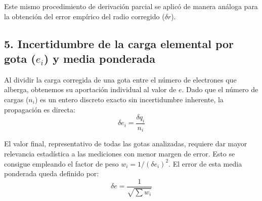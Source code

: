 \documentclass[9pt,a4paper,twocolumn,twoside]{rho-class/rho}
\begin{document}
Este mismo procedimiento de derivación parcial se aplicó de manera análoga para la obtención del error empírico del radio corregido ($\delta r$).

\subsection*{5. Incertidumbre de la carga elemental por gota ($e_i$) y media ponderada}

Al dividir la carga corregida de una gota entre el número de electrones que alberga, obtenemos su aportación individual al valor de $e$. Dado que el número de cargas ($n_i$) es un entero discreto exacto sin incertidumbre inherente, la propagación es directa:
\vspace{0.2cm}
\begin{equation*}
    \delta e_i = \frac{\delta q_i}{n_i}
\end{equation*}
\vspace{0.2cm}

El valor final, representativo de todas las gotas analizadas, requiere dar mayor relevancia estadística a las mediciones con menor margen de error. Esto se consigue empleando el factor de peso $w_i = 1 / (\delta e_i)^2$. El error de esta media ponderada queda definido por:
\vspace{0.2cm}
\begin{equation*}
    \delta e = \frac{1}{\sqrt{\sum w_i}}
\end{equation*}
\vspace{0.2cm}
\end{document}
